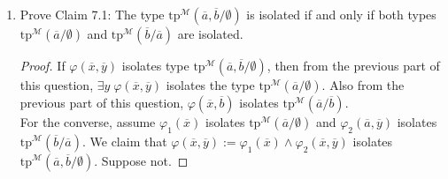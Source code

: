 \documentclass{article}
\begin{document}
\begin{enumerate}[label={\bf Q\arabic*:}]
\begin{enumerate}
\begin{proof}
          The second assertion can be proven in a similar manner. Assume by
          contradiction that $\varphi(x,b)$ does not isolate
          $\text{tp}^{\mathcal{M}}(a/b)$. Then there must exist a formula
          $\theta'(x)\in\text{tp}^{\mathcal{M}}(a/b)$ such that
          $\mathcal{M}\models\varphi(x,b)\wedge\neg\theta'(x)$. Now
          $\theta'(x)\in \text{tp}^{\mathcal{M}}(a/b)$ implies that
          $\theta'(x)$ is equivalent to some formula $\theta(x,b)$ where
          $\theta(x,y)\in\text{tp}^{\mathcal{M}}(a,b/\emptyset)$. So we
          have $\mathcal{M}\models\varphi(x,b)\wedge\neg\theta(x,b)$.  This
          means there exists $a'\in M$ such that
          $\mathcal{M}\models\varphi(a',b)\wedge\neg\theta(a',b)$, which
          means $\mathcal{M}\not\models\varphi(x,y)\rightarrow\theta(x,y)$.
          However, since
          $\theta(x,y)\in\text{tp}^{\mathcal{M}}(a,b/\emptyset)$, the
          statement contradicts $\varphi(x,y)$ isolating
          $\text{tp}^{\mathcal{M}}(a,b/\emptyset)$. \\
        \end{proof}

      \item Prove Claim 7.1: The type
        $\text{tp}^{\mathcal{M}}(\overline{a},\overline{b}/\emptyset)$ is
        isolated if and only if both types
        $\text{tp}^{\mathcal{M}}(\overline{a}/\emptyset)$ and
        $\text{tp}^{\mathcal{M}}(\overline{b}/\overline{a})$ are isolated.

        \begin{proof}
          If $\varphi(\overline{x},\overline{y})$ isolates type
          $\text{tp}^{\mathcal{M}}(\overline{a},\overline{b}/\emptyset)$,
          then from the previous part of this question, $\exists y\;
          \varphi(\overline{x},\overline{y})$ isolates the type
          $\text{tp}^{\mathcal{M}}(\overline{a}/\emptyset)$. Also from the
          previous part of this question,
          $\varphi(\overline{x},\overline{b})$ isolates
          $\text{tp}^{\mathcal{M}}(\overline{a}/\overline{b})$. \\

          For the converse, assume $\varphi_1(\overline{x})$ isolates
          $\text{tp}^{\mathcal{M}}(\overline{a}/\emptyset)$ and
          $\varphi_2(\overline{a},\overline{y})$ isolates
          $\text{tp}^{\mathcal{M}}(\overline{b}/\overline{a})$. We claim
          that
          $\varphi(\overline{x},\overline{y}):=
          \varphi_1(\overline{x})\wedge\varphi_2(\overline{x},\overline{y})$
          isolates
          $\text{tp}^{\mathcal{M}}(\overline{a},\overline{b}/\emptyset)$.
          Suppose not.
        \end{proof}
    \end{enumerate}
\end{enumerate}
\end{document}
